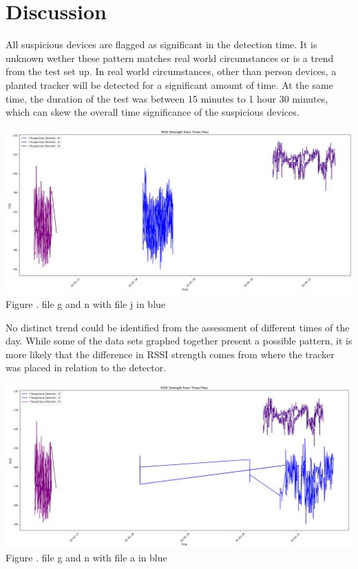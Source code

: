 \documentclass{article}
\begin{document}
\section{Discussion}
\begin{multicols}{2}


All suspicious devices are flagged as significant in the detection time. It is unknown wether these pattern matches real world circumstances or is a trend from the test set up. In real world circumstances, other than person devices, a planted tracker will be detected for a significant amount of time. At the same time, the duration of the test was between 15 minutes to 1 hour 30 minutes, which can skew the overall time significance of the suspicious devices.
\begin{center}
\includegraphics[width=1\linewidth]{three-g-n-j.png}
Figure . file g and n with file j in blue
\end{center}
No distinct trend could be identified from the assessment of different times of the day. While some of the data sets graphed together present a possible pattern, it is more likely that the difference in RSSI strength comes from where the tracker was placed in relation to the detector.

\begin{center}

\includegraphics[width=1\linewidth]{timeofday_a_g_n.png}
Figure . file g and n with file a in blue
\end{center}
\end{multicols}
    
\end{document}
